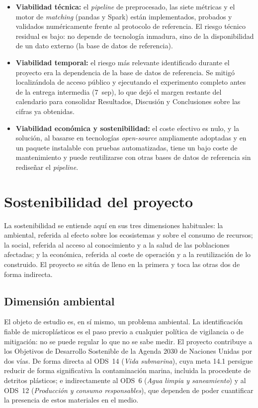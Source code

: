 \begin{itemize}
    \item \textbf{Viabilidad técnica:} el \textit{pipeline} de preprocesado, las siete métricas y el motor de \textit{matching} (pandas y Spark) están implementados, probados y validados numéricamente frente al protocolo de referencia. El riesgo técnico residual es bajo: no depende de tecnología inmadura, sino de la disponibilidad de un dato externo (la base de datos de referencia).
    \item \textbf{Viabilidad temporal:} el riesgo más relevante identificado durante el proyecto era la dependencia de la base de datos de referencia. Se mitigó localizándola de acceso público y ejecutando el experimento completo antes de la entrega intermedia (7~sep), lo que dejó el margen restante del calendario para consolidar Resultados, Discusión y Conclusiones sobre las cifras ya obtenidas.
    \item \textbf{Viabilidad económica y sostenibilidad:} el coste efectivo es nulo, y la solución, al basarse en tecnologías \textit{open-source} ampliamente adoptadas y en un paquete instalable con pruebas automatizadas, tiene un bajo coste de mantenimiento y puede reutilizarse con otras bases de datos de referencia sin rediseñar el \textit{pipeline}.
\end{itemize}

\section{Sostenibilidad del proyecto}

La sostenibilidad se entiende aquí en sus tres dimensiones habituales: la ambiental, referida al efecto sobre los ecosistemas y sobre el consumo de recursos; la social, referida al acceso al conocimiento y a la salud de las poblaciones afectadas; y la económica, referida al coste de operación y a la reutilización de lo construido. El proyecto se sitúa de lleno en la primera y toca las otras dos de forma indirecta.

\subsection*{Dimensión ambiental}

El objeto de estudio es, en sí mismo, un problema ambiental. La identificación fiable de microplásticos es el paso previo a cualquier política de vigilancia o de mitigación: no se puede regular lo que no se sabe medir. El proyecto contribuye a los Objetivos de Desarrollo Sostenible de la Agenda 2030 de Naciones Unidas por dos vías. De forma directa al ODS~14 (\emph{Vida submarina}), cuya meta 14.1 persigue reducir de forma significativa la contaminación marina, incluida la procedente de detritos plásticos; e indirectamente al ODS~6 (\emph{Agua limpia y saneamiento}) y al ODS~12 (\emph{Producción y consumo responsables}), que dependen de poder cuantificar la presencia de estos materiales en el medio.

